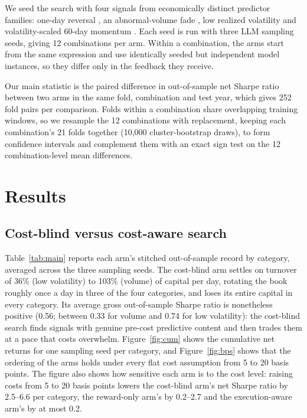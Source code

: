 \documentclass[preprint,12pt,authoryear]{elsarticle}
\begin{document}
We seed the search with four signals from economically distinct predictor families: one-day reversal \citep{jegadeesh1990}, an abnormal-volume fade \citep{gervais2001}, low realized volatility \citep{ang2006} and volatility-scaled 60-day momentum \citep{jegadeesh1993}. Each seed is run with three LLM sampling seeds, giving 12 combinations per arm. Within a combination, the arms start from the same expression and use identically seeded but independent model instances, so they differ only in the feedback they receive.

Our main statistic is the paired difference in out-of-sample net Sharpe ratio between two arms in the same fold, combination and test year, which gives 252 fold pairs per comparison. Folds within a combination share overlapping training windows, so we resample the 12 combinations with replacement, keeping each combination's 21 folds together (10,000 cluster-bootstrap draws), to form confidence intervals and complement them with an exact sign test on the 12 combination-level mean differences.

\section{Results}\label{sec:results}

\subsection{Cost-blind versus cost-aware search}\label{sec:main}

Table~\ref{tab:main} reports each arm's stitched out-of-sample record by category, averaged across the three sampling seeds. The cost-blind arm settles on turnover of 36\% (low volatility) to 103\% (volume) of capital per day, rotating the book roughly once a day in three of the four categories, and loses its entire capital in every category. Its average gross out-of-sample Sharpe ratio is nonetheless positive (0.56; between 0.33 for volume and 0.74 for low volatility): the cost-blind search finds signals with genuine pre-cost predictive content and then trades them at a pace that costs overwhelm. Figure~\ref{fig:cum} shows the cumulative net returns for one sampling seed per category, and Figure~\ref{fig:bps} shows that the ordering of the arms holds under every flat cost assumption from 5 to 20 basis points. The figure also shows how sensitive each arm is to the cost level: raising costs from 5 to 20 basis points lowers the cost-blind arm's net Sharpe ratio by 2.5--6.6 per category, the reward-only arm's by 0.2--2.7 and the execution-aware arm's by at most 0.2.
\end{document}
